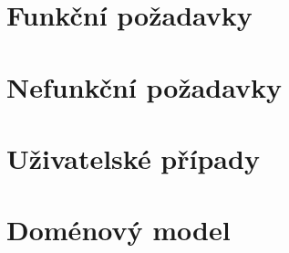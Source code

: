 





\section{Funkční požadavky}\label{sec:funcniPozadavky}
\section{Nefunkční požadavky}\label{sec:nefuncniPozadavky}
\section{Uživatelské případy}\label{sec:uzivatelskePripady}
\section{Doménový model}\label{sec:domenovyModel}

